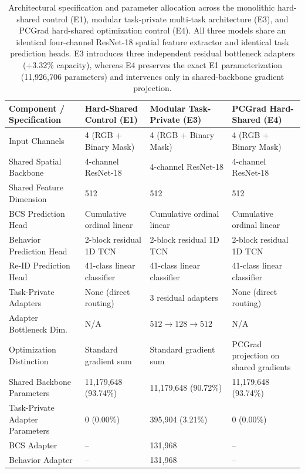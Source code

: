 \begin{table}[htbp]
\centering\small
\caption[Architectural specification of multi-task configurations]{Architectural specification and parameter allocation across the monolithic hard-shared control (E1), modular task-private multi-task architecture (E3), and PCGrad hard-shared optimization control (E4). All three models share an identical four-channel ResNet-18 spatial feature extractor and identical task prediction heads. E3 introduces three independent residual bottleneck adapters (+3.32\% capacity), whereas E4 preserves the exact E1 parameterization (11,926,706 parameters) and intervenes only in shared-backbone gradient projection.}\label{tab:mtl_architecture_spec}
\begin{tabularx}{\textwidth}{l Y Y Y}
\toprule
\textbf{Component / Specification} & \textbf{Hard-Shared Control (E1)} & \textbf{Modular Task-Private (E3)} & \textbf{PCGrad Hard-Shared (E4)} \\
\midrule
Input Channels & 4 (RGB + Binary Mask) & 4 (RGB + Binary Mask) & 4 (RGB + Binary Mask) \\
Shared Spatial Backbone & 4-channel ResNet-18 & 4-channel ResNet-18 & 4-channel ResNet-18 \\
Shared Feature Dimension & 512 & 512 & 512 \\
BCS Prediction Head & Cumulative ordinal linear & Cumulative ordinal linear & Cumulative ordinal linear \\
Behavior Prediction Head & 2-block residual 1D TCN & 2-block residual 1D TCN & 2-block residual 1D TCN \\
Re-ID Prediction Head & 41-class linear classifier & 41-class linear classifier & 41-class linear classifier \\
Task-Private Adapters & None (direct routing) & 3 residual adapters & None (direct routing) \\
Adapter Bottleneck Dim. & N/A & $512 \to 128 \to 512$ & N/A \\
Optimization Distinction & Standard gradient sum & Standard gradient sum & PCGrad projection on shared gradients \\
\midrule
Shared Backbone Parameters & 11,179,648 (93.74\%) & 11,179,648 (90.72\%) & 11,179,648 (93.74\%) \\
Task-Private Adapter Parameters & 0 (0.00\%) & 395,904 (3.21\%) & 0 (0.00\%) \\
\quad BCS Adapter & -- & 131,968 & -- \\
\quad Behavior Adapter & -- & 131,968 & -- \\

\end{tabularx}
\end{table}
